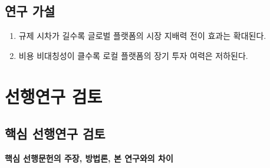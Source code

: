 \documentclass[11pt,a4paper]{report}
\begin{document}
\section{연구 가설}
\begin{enumerate}[label=\arabic*.]
  \item 규제 시차가 길수록 글로벌 플랫폼의 시장 지배력 전이 효과는 확대된다.
  \item 비용 비대칭성이 클수록 로컬 플랫폼의 장기 투자 여력은 저하된다.
\end{enumerate}

\chapter{선행연구 검토}
\section{핵심 선행연구 검토}
\footnotesize
\noindent\textbf{핵심 선행문헌의 주장, 방법론, 본 연구와의 차이}
\end{document}

